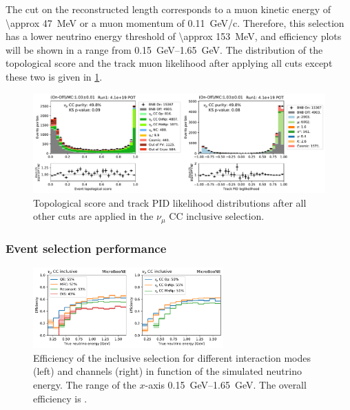 The cut on the reconstructed length corresponds to a muon kinetic energy of \SI{\approx 47}{\MeV} or a muon momentum of \SI{0.11}{GeV/c}. Therefore, this selection has a lower neutrino energy threshold of \SI{\approx 153}{\MeV}, and efficiency plots will be shown in a range from \SIrange{0.15}{1.65}{\GeV}.
The distribution of the topological score and the track muon likelihood after applying all cuts except these two is given in \cref{fig:numu:topo_pid}.


\begin{figure}[htb]
    \centering
    \includegraphics[width=\textwidth]{NuMuCCsel/Images/run1/numu_pret_run1.pdf}
    \caption{Topological score and track PID likelihood distributions after all other cuts are applied in the $\nu_\mu$ CC inclusive selection.}
    \label{fig:numu:topo_pid}
\end{figure}



\subsubsection{Event selection performance}

\begin{figure}[htb]
\centering
\includegraphics[width=0.65\textwidth]{Inclusive/Images/efficiency_inclusive.pdf}
\caption[Efficiency of the inclusive \numucc selection for different interaction modes and channels]{Efficiency of the inclusive \numucc selection for different interaction modes (left) and channels (right) in function of the simulated neutrino energy. The range of the $x$-axis \SIrange{0.15}{1.65}{\GeV}. The overall efficiency is .}
\label{fig:efficiency_inclusive}
\end{figure}

